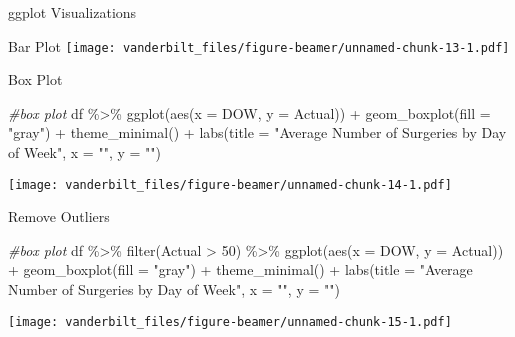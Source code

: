 \documentclass[
  ignorenonframetext,
]{beamer}
\newenvironment{Shaded}{\begin{snugshade}}{\end{snugshade}}
\newcommand{\AttributeTok}[1]{\textcolor[rgb]{0.77,0.63,0.00}{#1}}
\newcommand{\CommentTok}[1]{\textcolor[rgb]{0.56,0.35,0.01}{\textit{#1}}}
\newcommand{\DecValTok}[1]{\textcolor[rgb]{0.00,0.00,0.81}{#1}}
\newcommand{\FunctionTok}[1]{\textcolor[rgb]{0.00,0.00,0.00}{#1}}
\newcommand{\NormalTok}[1]{#1}
\newcommand{\SpecialCharTok}[1]{\textcolor[rgb]{0.00,0.00,0.00}{#1}}
\newcommand{\StringTok}[1]{\textcolor[rgb]{0.31,0.60,0.02}{#1}}
\begin{document}
\begin{frame}[fragile]{ggplot Visualizations}
\begin{block}{Bar Plot}
\texttt{[image: vanderbilt\_files/figure-beamer/unnamed-chunk-13-1.pdf]}
\end{block}

\begin{block}{Box Plot}
\protect\hypertarget{box-plot}{}
\begin{Shaded}
\begin{Highlighting}[]
\CommentTok{\#box plot}
\NormalTok{df }\SpecialCharTok{\%\textgreater{}\%} 
  \FunctionTok{ggplot}\NormalTok{(}\FunctionTok{aes}\NormalTok{(}\AttributeTok{x =}\NormalTok{ DOW, }\AttributeTok{y =}\NormalTok{ Actual)) }\SpecialCharTok{+} 
  \FunctionTok{geom\_boxplot}\NormalTok{(}\AttributeTok{fill =} \StringTok{"gray"}\NormalTok{) }\SpecialCharTok{+} 
  \FunctionTok{theme\_minimal}\NormalTok{() }\SpecialCharTok{+} 
  \FunctionTok{labs}\NormalTok{(}\AttributeTok{title =} \StringTok{"Average Number of Surgeries by Day of Week"}\NormalTok{,}
       \AttributeTok{x =} \StringTok{""}\NormalTok{,}
       \AttributeTok{y =} \StringTok{""}\NormalTok{)}
\end{Highlighting}
\end{Shaded}

\texttt{[image: vanderbilt\_files/figure-beamer/unnamed-chunk-14-1.pdf]}
\end{block}

\begin{block}{Remove Outliers}
\protect\hypertarget{remove-outliers-1}{}
\begin{Shaded}
\begin{Highlighting}[]
\CommentTok{\#box plot}
\NormalTok{df }\SpecialCharTok{\%\textgreater{}\%} 
  \FunctionTok{filter}\NormalTok{(Actual }\SpecialCharTok{\textgreater{}} \DecValTok{50}\NormalTok{) }\SpecialCharTok{\%\textgreater{}\%} 
  \FunctionTok{ggplot}\NormalTok{(}\FunctionTok{aes}\NormalTok{(}\AttributeTok{x =}\NormalTok{ DOW, }\AttributeTok{y =}\NormalTok{ Actual)) }\SpecialCharTok{+} 
  \FunctionTok{geom\_boxplot}\NormalTok{(}\AttributeTok{fill =} \StringTok{"gray"}\NormalTok{) }\SpecialCharTok{+} 
  \FunctionTok{theme\_minimal}\NormalTok{() }\SpecialCharTok{+} 
  \FunctionTok{labs}\NormalTok{(}\AttributeTok{title =} \StringTok{"Average Number of Surgeries by Day of Week"}\NormalTok{,}
       \AttributeTok{x =} \StringTok{""}\NormalTok{,}
       \AttributeTok{y =} \StringTok{""}\NormalTok{)}
\end{Highlighting}
\end{Shaded}

\texttt{[image: vanderbilt\_files/figure-beamer/unnamed-chunk-15-1.pdf]}
\end{block}
\end{frame}
\end{document}
